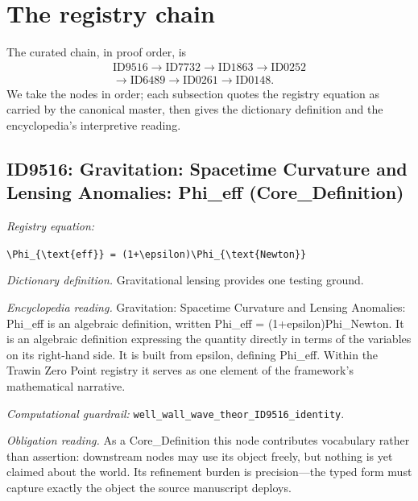 \documentclass[11pt]{article}
\theoremstyle{remark}
\begin{document}
\section{The registry chain}
\label{sec:chain}

The curated chain, in proof order, is
\begin{equation*}
\begin{gathered}
\text{ID9516} \to \text{ID7732} \to \text{ID1863} \to \text{ID0252} \\
\to \text{ID6489} \to \text{ID0261} \to \text{ID0148}.
\end{gathered}
\end{equation*}
We take the nodes in order; each subsection quotes the registry equation as carried by the canonical master, then gives the dictionary definition and the encyclopedia's interpretive reading.

\subsection{ID9516: Gravitation: Spacetime Curvature and Lensing Anomalies: Phi\_eff (Core\_Definition)}

\noindent\textit{Registry equation:}\par
{\small\texttt{\textbackslash{}Phi\_\{\textbackslash{}text\{eff\}\} = (1+\textbackslash{}epsilon)\textbackslash{}Phi\_\{\textbackslash{}text\{Newton\}\}}}\par\medskip
\noindent\textit{Dictionary definition.} Gravitational lensing provides one testing ground.\par\medskip
\noindent\textit{Encyclopedia reading.} Gravitation: Spacetime Curvature and Lensing Anomalies: Phi\_eff is an algebraic definition, written Phi\_eff = (1+epsilon)Phi\_Newton. It is an algebraic definition expressing the quantity directly in terms of the variables on its right-hand side. It is built from epsilon, defining Phi\_eff. Within the Trawin Zero Point registry it serves as one element of the framework's mathematical narrative.
\par\medskip\noindent\textit{Computational guardrail:} \texttt{well\_wall\_wave\_theor\_ID9516\_identity}.
\par\medskip\noindent\textit{Obligation reading.} As a Core\_Definition this node contributes vocabulary rather than assertion: downstream nodes may use its object freely, but nothing is yet claimed about the world. Its refinement burden is precision---the typed form must capture exactly the object the source manuscript deploys.
\end{document}
